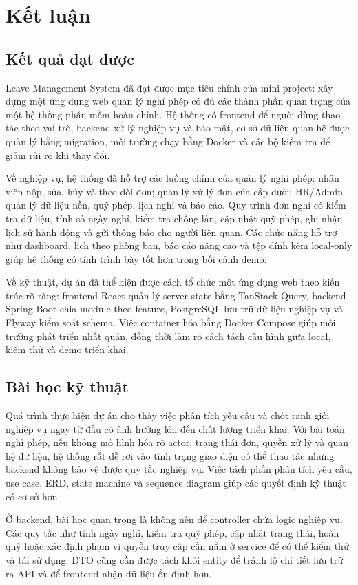 \chapter{Kết luận}

\section{Kết quả đạt được}
Leave Management System đã đạt được mục tiêu chính của mini-project: xây dựng một ứng dụng web quản lý nghỉ phép có đủ các thành phần quan trọng của một hệ thống phần mềm hoàn chỉnh. Hệ thống có frontend để người dùng thao tác theo vai trò, backend xử lý nghiệp vụ và bảo mật, cơ sở dữ liệu quan hệ được quản lý bằng migration, môi trường chạy bằng Docker và các bộ kiểm tra để giảm rủi ro khi thay đổi.

Về nghiệp vụ, hệ thống đã hỗ trợ các luồng chính của quản lý nghỉ phép: nhân viên nộp, sửa, hủy và theo dõi đơn; quản lý xử lý đơn của cấp dưới; HR/Admin quản lý dữ liệu nền, quỹ phép, lịch nghỉ và báo cáo. Quy trình đơn nghỉ có kiểm tra dữ liệu, tính số ngày nghỉ, kiểm tra chồng lấn, cập nhật quỹ phép, ghi nhận lịch sử hành động và gửi thông báo cho người liên quan. Các chức năng hỗ trợ như dashboard, lịch theo phòng ban, báo cáo nâng cao và tệp đính kèm local-only giúp hệ thống có tính trình bày tốt hơn trong bối cảnh demo.

Về kỹ thuật, dự án đã thể hiện được cách tổ chức một ứng dụng web theo kiến trúc rõ ràng: frontend React quản lý server state bằng TanStack Query, backend Spring Boot chia module theo feature, PostgreSQL lưu trữ dữ liệu nghiệp vụ và Flyway kiểm soát schema. Việc container hóa bằng Docker Compose giúp môi trường phát triển nhất quán, đồng thời làm rõ cách tách cấu hình giữa local, kiểm thử và demo triển khai.

\section{Bài học kỹ thuật}
Quá trình thực hiện dự án cho thấy việc phân tích yêu cầu và chốt ranh giới nghiệp vụ ngay từ đầu có ảnh hưởng lớn đến chất lượng triển khai. Với bài toán nghỉ phép, nếu không mô hình hóa rõ actor, trạng thái đơn, quyền xử lý và quan hệ dữ liệu, hệ thống rất dễ rơi vào tình trạng giao diện có thể thao tác nhưng backend không bảo vệ được quy tắc nghiệp vụ. Việc tách phần phân tích yêu cầu, use case, ERD, state machine và sequence diagram giúp các quyết định kỹ thuật có cơ sở hơn.

Ở backend, bài học quan trọng là không nên để controller chứa logic nghiệp vụ. Các quy tắc như tính ngày nghỉ, kiểm tra quỹ phép, cập nhật trạng thái, hoàn quỹ hoặc xác định phạm vi quyền truy cập cần nằm ở service để có thể kiểm thử và tái sử dụng. DTO cũng cần được tách khỏi entity để tránh lộ chi tiết lưu trữ ra API và để frontend nhận dữ liệu ổn định hơn.

